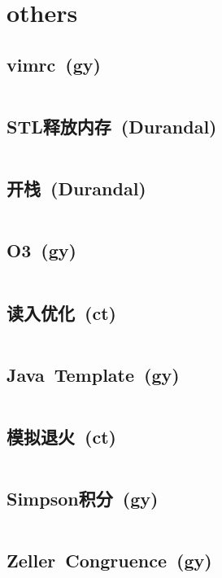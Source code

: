 \chapter{others}
\section{vimrc\ \small(gy)}
	\inputminted{vim}{others/.vimrc}
\section{STL释放内存\ \small(Durandal)}
	\inputminted{cpp}{others/stl_clear.cpp}
\section{开栈\ \small(Durandal)}
	\inputminted{cpp}{others/rsp.cpp}
\section{O3\ \small(gy)}
	\inputminted{cpp}{others/o3.cpp}
\section{读入优化\ \small(ct)}
    \inputminted{cpp}{others/input_optimize.cpp}
\section{Java\ Template\ \small(gy)}
	\inputminted{java}{others/Template.java}
\section{模拟退火\ \small(ct)}
	\inputminted{cpp}{others/simulated_annealing.cpp}
\section{Simpson积分\ \small(gy)}
	\inputminted{cpp}{others/simpson.cpp}
\section{Zeller\ Congruence\ \small(gy)}
	\inputminted{cpp}{others/zeller_congruence.cpp}
